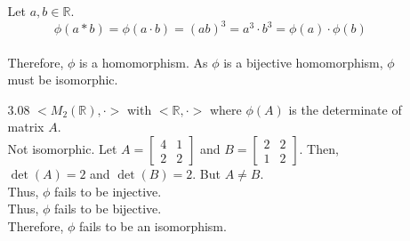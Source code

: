 \documentclass[12pt]{article}
\newcommand{\R}{\mathbb{R}}
\begin{document}
\begin{enumerate}
\begin{enumerate}
			Let $a,b \in \R $. 
			\[\phi(a * b) = \phi(a\cdot b) = (ab)^3 = a^3 \cdot b^3 = \phi(a)\cdot\phi(b) \]\\
			Therefore, $\phi$ is a homomorphism.
			As $\phi$ is a bijective homomorphism, $\phi$ must be isomorphic.
			\item[3.08] $<M_2(\R),\cdot>$ with $<\R,\cdot>$ where $\phi(A)$ is the determinate of matrix $A$.\\
				Not isomorphic. Let $ A = \begin{bmatrix} 
												4 & 1 \\
												2 & 2 
											\end{bmatrix}  $ and 
									$ B = \begin{bmatrix} 
												2 & 2 \\
												1 & 2 
											\end{bmatrix}  $. 
										Then, $ \det(A) = 2$ and $ \det(B) = 2$.
											 But $ A \not = B $. \\
											 Thus, $ \phi $ fails to be injective.\\
											 Thus, $ \phi $ fails to be bijective.\\
											 Therefore, $ \phi $ fails to be an isomorphism.
									 

\end{enumerate}
\end{enumerate}
\end{document}
